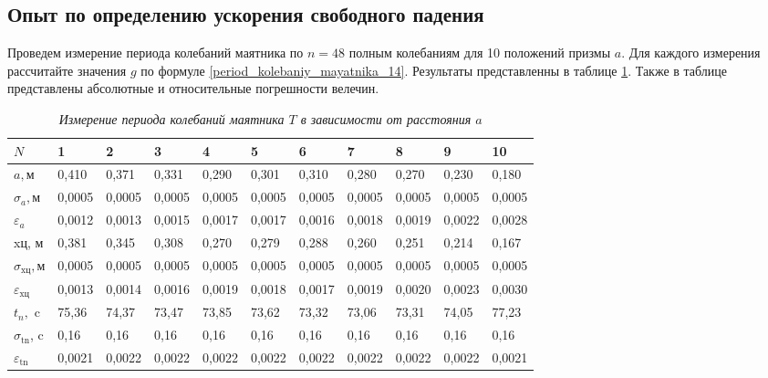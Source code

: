 \documentclass[a4paper,12pt]{article}
\begin{document}
\subsection{Опыт по определению ускорения свободного падения}

Проведем измерение периода колебаний маятника по $n = 48$ полным колебаниям для 10 положений призмы $a$. Для каждого измерения рассчитайте значения $g$ по формуле \eqref{period_kolebaniy_mayatnika_14}. Результаты представленны в таблице \ref{rez_opita}. Также в таблице представлены абсолютные и относительные погрешности велечин.



\begin{table}[h]
\caption{\textit{Измерение периода колебаний маятника $T$ в зависимости от расстояния $a$}}
\label{rez_opita}
\begin{tabular}{|l|l|l|l|l|l|l|l|l|l|l|}
\hline
$N$                     & 1      & 2      & 3      & 4      & 5      & 6      & 7      & 8      & 9      & 10     \\ \hline
$a, \text{м}$                      & 0,410  & 0,371  & 0,331  & 0,290  & 0,301  & 0,310  & 0,280  & 0,270  & 0,230  & 0,180  \\ \hline
$\sigma_a, \text{м}$                        & 0,0005 & 0,0005 & 0,0005 & 0,0005 & 0,0005 & 0,0005 & 0,0005 & 0,0005 & 0,0005 & 0,0005 \\ \hline
$\varepsilon_a$                        & 0,0012 & 0,0013 & 0,0015 & 0,0017 & 0,0017 & 0,0016 & 0,0018 & 0,0019 & 0,0022 & 0,0028 \\ \hline
xц, м                     & 0,381  & 0,345  & 0,308  & 0,270  & 0,279  & 0,288  & 0,260  & 0,251  & 0,214  & 0,167  \\ \hline
$\sigma_{\text{xц}}, \text{м} $                     & 0,0005 & 0,0005 & 0,0005 & 0,0005 & 0,0005 & 0,0005 & 0,0005 & 0,0005 & 0,0005 & 0,0005 \\ \hline
$\varepsilon_{\text{xц}}$                      & 0,0013 & 0,0014 & 0,0016 & 0,0019 & 0,0018 & 0,0017 & 0,0019 & 0,0020 & 0,0023 & 0,0030 \\ \hline
$t_n, $ c                     & 75,36  & 74,37  & 73,47  & 73,85  & 73,62  & 73,32  & 73,06  & 73,31  & 74,05  & 77,23  \\ \hline
$\sigma_{\text{tn}} $, c                      & 0,16   & 0,16   & 0,16   & 0,16   & 0,16   & 0,16   & 0,16   & 0,16   & 0,16   & 0,16   \\ \hline
$\varepsilon_{\text{tn}} $                         & 0,0021 & 0,0022 & 0,0022 & 0,0022 & 0,0022 & 0,0022 & 0,0022 & 0,0022 & 0,0022 & 0,0021 \\ \hline

\end{tabular}
\end{table}
\end{document}

